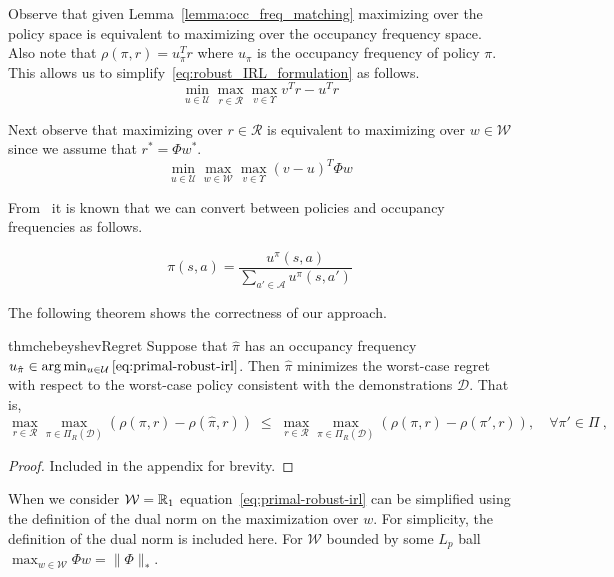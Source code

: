 \documentclass[10pt]{article}
\renewcommand{\cite}{\citep}
\begin{document}
Observe that given Lemma~\ref{lemma:occ_freq_matching} maximizing over the policy space is equivalent to maximizing over the occupancy frequency space.
Also note that $\rho(\pi,r) = u_{\pi}^T r$ where $u_{\pi}$ is the occupancy frequency of policy $\pi$. This allows us to simplify~\eqref{eq:robust_IRL_formulation} as follows.
%
\begin{equation}
	\min_{u \in \mathcal{U}} \max_{r \in \mathcal{R}} \max_{v \in \Upsilon} v^T r - u^T r
\end{equation}

Next observe that maximizing over $r \in \mathcal{R}$ is equivalent to maximizing over $w \in \mathcal{W}$ since we assume that $r^* = \Phi w^*$.
%
\begin{equation}\label{eq:primal-robust-irl}
	\min_{u \in \mathcal{U}} \max_{w \in \mathcal{W}} \max_{v \in \Upsilon} (v - u)^T \Phi w
\end{equation}

From~\cite{Puterman1994} it is known that we can convert between policies and occupancy frequencies as follows.

\begin{equation}\label{eq:policy-construction}
	\pi(s, a) = \frac{u^{\pi}(s,a)}{\sum_{a' \in \mathcal{A}} u^{\pi}(s,a')}
\end{equation}

The following theorem shows the correctness of our approach.

\begin{restatable}{thm}{chebeyshevRegret}
\label{thrm:chebeyshevRegret}
	Suppose that $\hat{\pi}$ has an occupancy frequency $u_{\hat{\pi}} \in \arg\min_{u \in \mathcal{U}} \ref{eq:primal-robust-irl}$.
	Then $\hat{\pi}$ minimizes the worst-case regret with respect to the worst-case policy consistent with the demonstrations $\mathcal{D}$. That is,
	\[
		\max_{r\in \mathcal{R}} \max_{\pi \in \Pi_{R}(\mathcal{D})} \left(\rho(\pi, r) - \rho(\hat{\pi}, r)\right)
		\; \le\;
		\max_{r\in \mathcal{R}} \max_{\pi \in \Pi_{R}(\mathcal{D})} \left(\rho(\pi, r) - \rho(\pi', r)\right), \quad  \forall \pi' \in \Pi~,
	\]
\end{restatable}

\begin{proof}
	Included in the appendix for brevity.
\end{proof}

When we consider $\mathcal{W} = \mathbb{R}_{1}$ equation~\eqref{eq:primal-robust-irl} can be simplified using the definition of the dual norm on the maximization
over $w$. For simplicity, the definition of the dual norm is included here. For $\mathcal{W}$ bounded by some $L_p$ ball $\max_{w \in \mathcal{W}} \Phi w = \|\Phi\|_*$.
\end{document}

